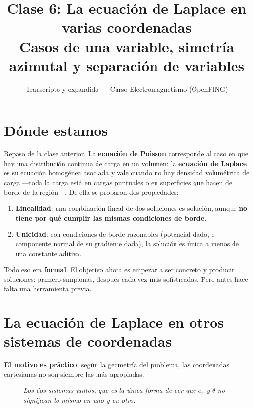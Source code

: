 \documentclass[12pt,a4paper]{article}
\title{\textbf{Clase 6: La ecuación de Laplace en varias coordenadas} \\[0.3em]
        \large{Casos de una variable, simetría azimutal y separación de variables}}
\author{Transcripto y expandido --- Curso Electromagnetismo (OpenFING)}
\date{}
\begin{document}
\maketitle
\thispagestyle{empty}
\newpage

\tableofcontents
\newpage


\section{Dónde estamos}

Repaso de la clase anterior. La \textbf{ecuación de Poisson} corresponde al caso
en que hay una distribución continua de carga en un volumen; la \textbf{ecuación
de Laplace} es su ecuación homogénea asociada y vale cuando no hay densidad
volumétrica de carga ---toda la carga está en cargas puntuales o en superficies
que hacen de borde de la región---. De ella se probaron dos propiedades:

\begin{enumerate}[leftmargin=*]
  \item \textbf{Linealidad}: una combinación lineal de dos soluciones es
        solución, aunque \textbf{no tiene por qué cumplir las mismas condiciones
        de borde}.
  \item \textbf{Unicidad}: con condiciones de borde razonables (potencial dado, o
        componente normal de su gradiente dada), la solución es única a menos de
        una constante aditiva.
\end{enumerate}

\begin{notebox}
Todo eso era \textbf{formal}. El objetivo ahora es empezar a ser concreto y
producir soluciones: primero simplonas, después cada vez más sofisticadas. Pero
antes hace falta una herramienta previa.
\end{notebox}

\section{La ecuación de Laplace en otros sistemas de coordenadas}

\textbf{El motivo es práctico:} según la geometría del problema, las coordenadas
cartesianas no son siempre las más apropiadas.

\begin{figure}[H]
  \centering
  
  \caption*{\small\itshape Los dos sistemas juntos, que es la única forma de ver
  que $\hat e_r$ y $\theta$ no significan lo mismo en uno y en otro.}
\end{figure}
\end{document}
